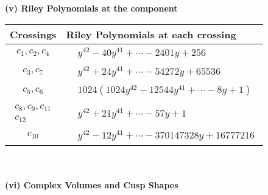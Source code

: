 \documentclass[1p]{elsarticle_modified}
\theoremstyle{definition}
\begin{document}
\newpage\renewcommand{\arraystretch}{1}
\flushleft \textbf{(v) Riley Polynomials at the component}\newline \\
\begin{tabular}{m{50pt}|m{274pt}}
Crossings & \hspace{64pt}Riley Polynomials at each crossing \\
\hline $$\begin{aligned}c_{1},c_{2},c_{4}\end{aligned}$$&$\begin{aligned}
&y^{42}-40 y^{41}+\cdots-2401 y+256
\end{aligned}$\\
\hline $$\begin{aligned}c_{3},c_{7}\end{aligned}$$&$\begin{aligned}
&y^{42}+24 y^{41}+\cdots-54272 y+65536
\end{aligned}$\\
\hline $$\begin{aligned}c_{5},c_{6}\end{aligned}$$&$\begin{aligned}
&1024(1024 y^{42}-12544 y^{41}+\cdots-8 y+1)
\end{aligned}$\\
\hline $$\begin{aligned}c_{8},c_{9},c_{11}\\c_{12}\end{aligned}$$&$\begin{aligned}
&y^{42}+21 y^{41}+\cdots-57 y+1
\end{aligned}$\\
\hline $$\begin{aligned}c_{10}\end{aligned}$$&$\begin{aligned}
&y^{42}-12 y^{41}+\cdots-370147328 y+16777216
\end{aligned}$\\
\hline
\end{tabular}\\~\\
\newpage\flushleft \textbf{(vi) Complex Volumes and Cusp Shapes}
\end{document}
